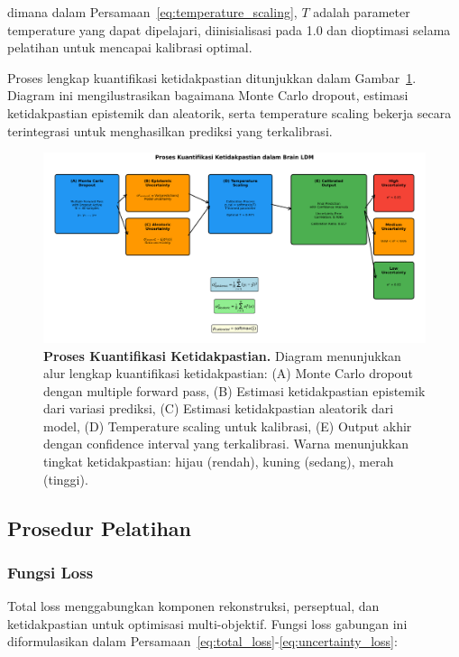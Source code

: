 dimana dalam Persamaan~\ref{eq:temperature_scaling}, $T$ adalah parameter temperature yang dapat dipelajari, diinisialisasi pada 1.0 dan dioptimasi selama pelatihan untuk mencapai kalibrasi optimal.

Proses lengkap kuantifikasi ketidakpastian ditunjukkan dalam Gambar~\ref{fig:uncertainty_process}. Diagram ini mengilustrasikan bagaimana Monte Carlo dropout, estimasi ketidakpastian epistemik dan aleatorik, serta temperature scaling bekerja secara terintegrasi untuk menghasilkan prediksi yang terkalibrasi.

\begin{figure}[htbp]
\centering
\includegraphics[width=\textwidth]{../figures/Fig_uncertainty_process.png}
\caption{\textbf{Proses Kuantifikasi Ketidakpastian.} Diagram menunjukkan alur lengkap kuantifikasi ketidakpastian: (A) Monte Carlo dropout dengan multiple forward pass, (B) Estimasi ketidakpastian epistemik dari variasi prediksi, (C) Estimasi ketidakpastian aleatorik dari model, (D) Temperature scaling untuk kalibrasi, (E) Output akhir dengan confidence interval yang terkalibrasi. Warna menunjukkan tingkat ketidakpastian: hijau (rendah), kuning (sedang), merah (tinggi).}
\label{fig:uncertainty_process}
\end{figure}

\subsection{Prosedur Pelatihan}

\subsubsection{Fungsi Loss}
Total loss menggabungkan komponen rekonstruksi, perseptual, dan ketidakpastian untuk optimisasi multi-objektif. Fungsi loss gabungan ini diformulasikan dalam Persamaan~\ref{eq:total_loss}-\ref{eq:uncertainty_loss}:

